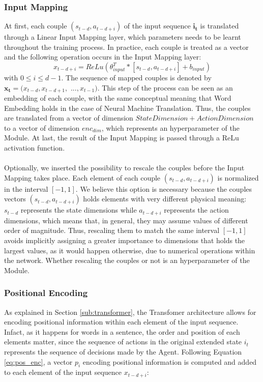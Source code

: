             \subsubsection{Input Mapping}
                At first, each couple $(s_{t-d}, a_{t-d+i})$ of the input sequence $\mathbf{i_t}$ is translated through a Linear Input Mapping layer, which parameters needs to be learnt throughout the training process. In practice, each couple is treated as a vector and the following operation occurs in the Input Mapping layer:
                \[ x_{t-d+i} = ReLu \left( \theta_{input}^{T} * [s_{t-d}, a_{t-d+i}] + b_{input} \right)\]
                with $0 \leq i \leq d - 1$. The sequence of mapped couples is denoted by $\mathbf{x_t} = (x_{t-d}, x_{t-d+1}, $ $..., x_{t-1})$. This step of the process can be seen as an embedding of each couple, with the same conceptual meaning that Word Embedding holds in the case of Neural Machine Translation. Thus, the couples are translated from a vector of dimension $State Dimension + Action Dimension$ to a vector of dimension $enc_{dim}$, which represents an hyperparameter of the Module. At last, the result of the Input Mapping is passed through a ReLu activation function.
                \\\\
                Optionally, we inserted the possibility to rescale the couples before the Input Mapping takes place. Each element of each couple $(s_{t-d}, a_{t-d+i})$ is normalized in the interval $[-1,1]$. We believe this option is necessary because the couples vectors $(s_{t-d}, a_{t-d+i})$ holds elements with very different physical meaning: $s_{t-d}$ represents the state dimensions while $a_{t-d+i}$ represents the action dimensions, which means that, in general, they may assume values of different order of magnitude. Thus, rescaling them to match the same interval $[-1,1]$ avoids implicitly assigning a greater importance to dimensions that holds the largest values, as it would happen otherwise, due to numerical operations within the network. Whether rescaling the couples or not is an hyperparameter of the Module.
                
            \subsubsection{Positional Encoding}
                As explained in Section \ref{sub:transformer}, the Transfomer architecture allows for encoding positional information within each element of the input sequence. Infact, as it happens for words in a sentence, the order and position of each elements matter, since the sequence of actions in the original extended state $i_t$ represents the sequence of decisions made by the Agent. Following Equation \ref{eq:pos_enc}, a vector $p_i$ encoding positional information is computed and added to each element of the input sequence $x_{t-d+i}$:
                
